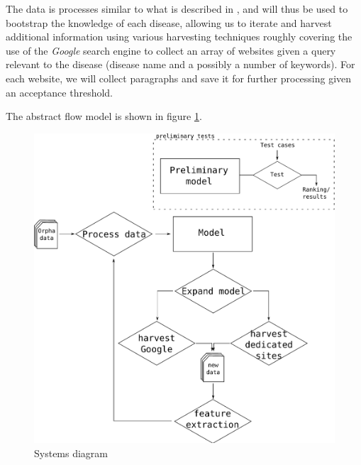\documentclass[10pt,letterpaper,final]{article}
\begin{document}


The data is processes similar to what is described in
\cite{jensenandersen}, and will thus be used to bootstrap the knowledge
of each disease, allowing us to iterate and harvest additional
information using various harvesting techniques roughly covering the use
of the \textit{Google} search engine to collect an array of websites
given a query relevant to the disease (disease name and a possibly a
number of keywords). For each website, we will collect paragraphs and
save it for further processing given an acceptance threshold.


The abstract flow model is shown in figure \ref{fig:flow}.

\begin{figure}[htp!]
\begin{center}
\includegraphics[scale=0.4]{images/pipeline}
\caption{Systems diagram}
\label{fig:flow}
\end{center}
\end{figure}
\end{document}
